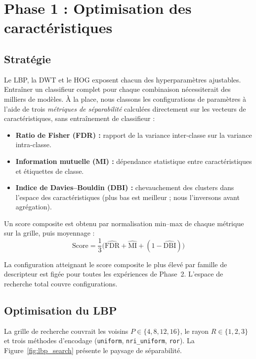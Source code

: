 \section{Phase 1 : Optimisation des caractéristiques}
\label{sec:phase1}

\subsection{Stratégie}

Le LBP, la DWT et le HOG exposent chacun des hyperparamètres ajustables. Entraîner
un classifieur complet pour chaque combinaison nécessiterait des milliers de modèles.
À la place, nous classons les configurations de paramètres à l'aide de trois
\emph{métriques de séparabilité} calculées directement sur les vecteurs de caractéristiques,
sans entraînement de classifieur :

\begin{itemize}
  \item \textbf{Ratio de Fisher (FDR) :} rapport de la variance inter-classe sur la variance intra-classe.
  \item \textbf{Information mutuelle (MI) :} dépendance statistique entre caractéristiques et étiquettes de classe.
  \item \textbf{Indice de Davies--Bouldin (DBI) :} chevauchement des clusters dans l'espace des caractéristiques
        (plus bas est meilleur ; nous l'inversons avant agrégation).
\end{itemize}

Un score composite est obtenu par normalisation min--max de chaque métrique sur la grille,
puis moyennage :
\[
  \text{Score} = \frac{1}{3}\Big(\widehat{\text{FDR}} + \widehat{\text{MI}} + (1 - \widehat{\text{DBI}})\Big)
\]

La configuration atteignant le score composite le plus élevé par famille de descripteur
est figée pour toutes les expériences de Phase~2. L'espace de recherche total couvre
\NPhaseOneConfigs{} configurations.

\subsection{Optimisation du LBP}

La grille de recherche couvrait les voisins $P \in \{4,8,12,16\}$, le rayon $R \in \{1,2,3\}$
et trois méthodes d'encodage (\texttt{uniform}, \texttt{nri\_uniform}, \texttt{ror}).
La Figure~\ref{fig:lbp_search} présente le paysage de séparabilité.


